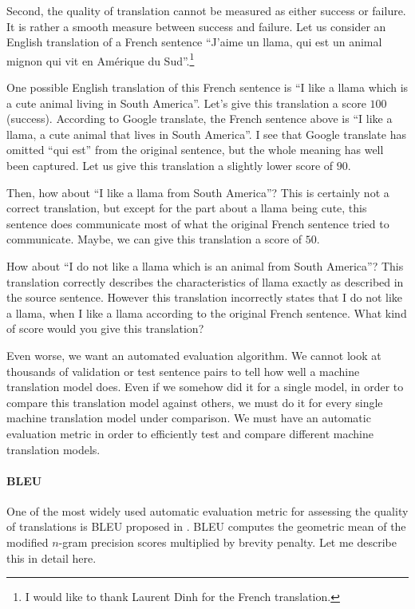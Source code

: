 \documentclass{report}
\begin{document}
Second, the quality of translation cannot be measured as either success or
failure. It is rather a smooth measure between success and failure. Let us
consider an English translation of a French sentence ``J'aime un llama, qui est
un animal mignon qui vit en Am\'erique du Sud''.\footnote{
    I would like to thank Laurent Dinh for the French translation.
}

One possible English translation of this French sentence is ``I like a llama
which is a cute animal living in South America''. Let's give this translation a
score $100$ (success). According to Google translate, the French sentence above
is ``I like a llama, a cute animal that lives in South America''. I see that
Google translate has omitted ``qui est'' from the original sentence, but the
whole meaning has well been captured. Let us give this translation a slightly
lower score of $90$. 

Then, how about ``I like a llama from South America''?  This is certainly not a
correct translation, but except for the part about a llama being cute, this
sentence does communicate most of what the original French sentence tried to
communicate. Maybe, we can give this translation a score of $50$. 

How about ``I do not like a llama which is an animal from South America''? This
translation correctly describes the characteristics of llama exactly as
described in the source sentence. However this translation incorrectly states
that I do not like a llama, when I like a llama according to the original French
sentence. What kind of score would you give this translation?

Even worse, we want an automated evaluation algorithm. We cannot look at
thousands of validation or test sentence pairs to tell how well a machine
translation model does. Even if we somehow did it for a single model, in order
to compare this translation model against others, we must do it for every single
machine translation model under comparison. We must have an automatic evaluation
metric in order to efficiently test and compare different machine translation
models.

\paragraph{BLEU} 
One of the most widely used automatic evaluation metric for assessing the
quality of translations is BLEU proposed in \cite{papineni2002bleu}. BLEU
computes the geometric mean of the modified $n$-gram precision scores multiplied
by brevity penalty. Let me describe this in detail here.
\end{document}
